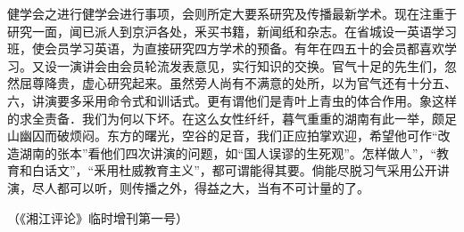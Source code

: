 健学会之进行健学会进行事项，会则所定大要系研究及传播最新学术。现在注重于研究一面，闻已派人到京沪各处，釆买书籍，新闻纸和杂志。在省城设一英语学习班，使会员学习英语，为直接研究四方学术的预备。有年在四五十的会员都喜欢学习。又设一演讲会由会员轮流发表意见，实行知识的交换。官气十足的先生们，忽然屈尊降贵，虚心研究起来。虽然旁人尚有不满意的处所，以为官气还有十分五、六，讲演要多采用命令式和训话式。更有谓他们是青叶上青虫的体合作用。象这样的求全责备．我们为何以下坏。在这么女性纤纤，暮气重重的湖南有此一举，颇足山幽囚而破烦闷。东方的曙光，空谷的足音，我们正应拍掌欢迎，希望他可作“改造湖南的张本”看他们四次讲演的问题，如“国人误谬的生死观”。怎样做人”，“教育和白话文”，“釆用杜威教育主义”，都可谓能得其要。倘能尽脱习气采用公开讲演，尽人都可以听，则传播之外，得益之大，当有不可计量的了。

\begin{flushright}（《湘江评论》临时增刊第一号）
\end{flushright}

